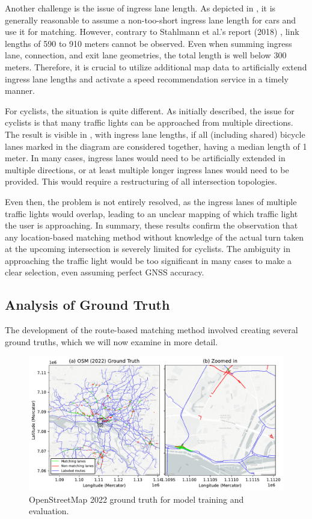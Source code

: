 Another challenge is the issue of ingress lane length. As depicted in , it is generally reasonable to assume a non-too-short ingress lane length for cars and use it for matching. However, contrary to Stahlmann et al.'s report (2018) \cite{stahlmann_exploring_2018}, link lengths of 590 to 910 meters cannot be observed. Even when summing ingress lane, connection, and exit lane geometries, the total length is well below 300 meters. Therefore, it is crucial to utilize additional map data to artificially extend ingress lane lengths and activate a speed recommendation service in a timely manner.

For cyclists, the situation is quite different. As initially described, the issue for cyclists is that many traffic lights can be approached from multiple directions. The result is visible in , with ingress lane lengths, if all (including shared) bicycle lanes marked in the diagram are considered together, having a median length of 1 meter. In many cases, ingress lanes would need to be artificially extended in multiple directions, or at least multiple longer ingress lanes would need to be provided. This would require a restructuring of all intersection topologies.

Even then, the problem is not entirely resolved, as the ingress lanes of multiple traffic lights would overlap, leading to an unclear mapping of which traffic light the user is approaching. In summary, these results confirm the observation that any location-based matching method without knowledge of the actual turn taken at the upcoming intersection is severely limited for cyclists. The ambiguity in approaching the traffic light would be too significant in many cases to make a clear selection, even assuming perfect GNSS accuracy.

\subsection{Analysis of Ground Truth}

The development of the route-based matching method involved creating several ground truths, which we will now examine in more detail.

\begin{figure}[htbp]
\centering 
\includegraphics[width=\linewidth]{images/matching-ground-truth-osm-old.pdf}
\caption{OpenStreetMap 2022 ground truth for model training and evaluation.}
\label{fig:matching-ground-truth-osm-old}
\end{figure}

